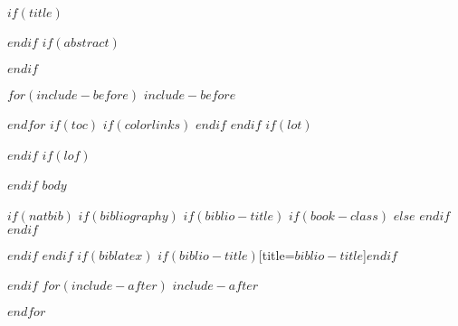 \documentclass{article}
\numberwithin{equation}{section}
\begin{document}
	$if(title)$
	\maketitle
	$endif$
	$if(abstract)$
	\begin{abstract}
		$abstract$
	\end{abstract}
	$endif$
	
	$for(include-before)$
	$include-before$
	
	$endfor$
	$if(toc)$
	{
		$if(colorlinks)$
		\hypersetup{linkcolor=$if(toccolor)$$toccolor$$else$black$endif$}
		$endif$
		\setcounter{tocdepth}{$toc-depth$}
		\tableofcontents
	}
	$endif$
	$if(lot)$
	\listoftables
	$endif$
	$if(lof)$
	\listoffigures
	$endif$
	$body$
	
	$if(natbib)$
	$if(bibliography)$
	$if(biblio-title)$
	$if(book-class)$
	\renewcommand\bibname{$biblio-title$}
	$else$
	\renewcommand\refname{$biblio-title$}
	$endif$
	$endif$
	
	
	$endif$
	$endif$
	$if(biblatex)$
	\printbibliography$if(biblio-title)$[title=$biblio-title$]$endif$
	
	$endif$
	$for(include-after)$
	$include-after$
	
	$endfor$
\end{document}
